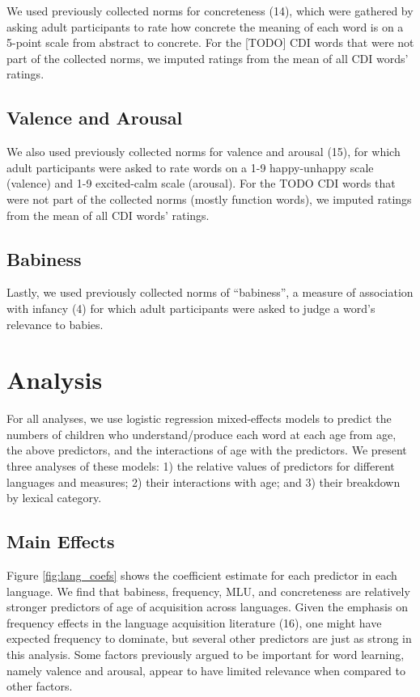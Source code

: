 \documentclass[9pt,twocolumn,twoside]{pnas-new}
\begin{document}
We used previously collected norms for concreteness (14), which were
gathered by asking adult participants to rate how concrete the meaning
of each word is on a 5-point scale from abstract to concrete. For the
{[}TODO{]} CDI words that were not part of the collected norms, we
imputed ratings from the mean of all CDI words' ratings.

\subsection{Valence and Arousal}\label{valence-and-arousal}

We also used previously collected norms for valence and arousal (15),
for which adult participants were asked to rate words on a 1-9
happy-unhappy scale (valence) and 1-9 excited-calm scale (arousal). For
the TODO CDI words that were not part of the collected norms (mostly
function words), we imputed ratings from the mean of all CDI words'
ratings.

\subsection{Babiness}\label{babiness}

Lastly, we used previously collected norms of ``babiness'', a measure of
association with infancy (4) for which adult participants were asked to
judge a word's relevance to babies.

\section*{Analysis}\label{analysis}

For all analyses, we use logistic regression mixed-effects models to
predict the numbers of children who understand/produce each word at each
age from age, the above predictors, and the interactions of age with the
predictors. We present three analyses of these models: 1) the relative
values of predictors for different languages and measures; 2) their
interactions with age; and 3) their breakdown by lexical category.

\subsection{Main Effects}\label{main-effects}

Figure \ref{fig:lang_coefs} shows the coefficient estimate for each
predictor in each language. We find that babiness, frequency, MLU, and
concreteness are relatively stronger predictors of age of acquisition
across languages. Given the emphasis on frequency effects in the
language acquisition literature (16), one might have expected frequency
to dominate, but several other predictors are just as strong in this
analysis. Some factors previously argued to be important for word
learning, namely valence and arousal, appear to have limited relevance
when compared to other factors.
\end{document}
